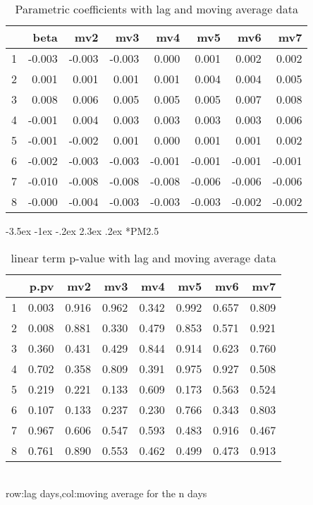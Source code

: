\documentclass[a4paper, 12pt]{article}
\makeatletter
\def\large{\fontsize{14}{20}\selectfont}
\renewcommand\subsection{\@startsection {subsection}{1}{\z@}%
                                   {-3.5ex \@plus -1ex \@minus -.2ex}%
                                   {2.3ex \@plus.2ex}%
                                   {\centering\normalfont\large\bfseries}}
\makeatother
\begin{document}
\begin{table}[h]
\centering
\caption{Parametric coefficients with lag and moving average data}
\begin{tabular}{rrrrrrrr}
  \hline
 & beta & mv2 & mv3 & mv4 & mv5 & mv6 & mv7 \\
  \hline
1 & -0.003 & -0.003 & -0.003 & 0.000 & 0.001 & 0.002 & 0.002 \\
  2 & 0.001 & 0.001 & 0.001 & 0.001 & 0.004 & 0.004 & 0.005 \\
  3 & 0.008 & 0.006 & 0.005 & 0.005 & 0.005 & 0.007 & 0.008 \\
  4 & -0.001 & 0.004 & 0.003 & 0.003 & 0.003 & 0.003 & 0.006 \\
  5 & -0.001 & -0.002 & 0.001 & 0.000 & 0.001 & 0.001 & 0.002 \\
  6 & -0.002 & -0.003 & -0.003 & -0.001 & -0.001 & -0.001 & -0.001 \\
  7 & -0.010 & -0.008 & -0.008 & -0.008 & -0.006 & -0.006 & -0.006 \\
  8 & -0.000 & -0.004 & -0.003 & -0.003 & -0.003 & -0.002 & -0.002 \\
   \hline
\end{tabular}
\end{table}
\clearpage
\subsection*{PM2.5}
\begin{table}[h]
\centering
\caption{linear term p-value with lag and moving average data}
\begin{tabular}{rrrrrrrr}
  \hline
 & p.pv & mv2 & mv3 & mv4 & mv5 & mv6 & mv7 \\
  \hline
1 & 0.003 & 0.916 & 0.962 & 0.342 & 0.992 & 0.657 & 0.809 \\
  2 & 0.008 & 0.881 & 0.330 & 0.479 & 0.853 & 0.571 & 0.921 \\
  3 & 0.360 & 0.431 & 0.429 & 0.844 & 0.914 & 0.623 & 0.760 \\
  4 & 0.702 & 0.358 & 0.809 & 0.391 & 0.975 & 0.927 & 0.508 \\
  5 & 0.219 & 0.221 & 0.133 & 0.609 & 0.173 & 0.563 & 0.524 \\
  6 & 0.107 & 0.133 & 0.237 & 0.230 & 0.766 & 0.343 & 0.803 \\
  7 & 0.967 & 0.606 & 0.547 & 0.593 & 0.483 & 0.916 & 0.467 \\
  8 & 0.761 & 0.890 & 0.553 & 0.462 & 0.499 & 0.473 & 0.913 \\
   \hline
\end{tabular}
\\row:lag days,col:moving average for the n days
\end{table}
\end{document}
